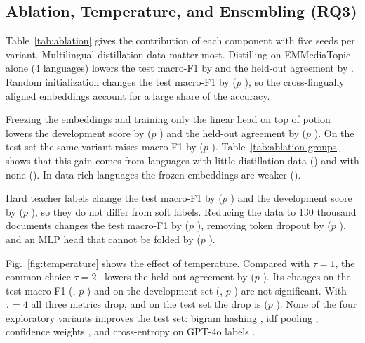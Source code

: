 \subsection{Ablation, Temperature, and Ensembling (RQ3)}
\TabAblation
\TabAblationGroups
Table~\ref{tab:ablation} gives the contribution of each component with five seeds per variant. Multilingual distillation data matter most. Distilling on EMMediaTopic alone (4 languages) lowers the test macro-F1 by  and the held-out agreement by . Random initialization changes the test macro-F1 by  ($p$ ), so the cross-lingually aligned embeddings account for a large share of the accuracy.

Freezing the embeddings and training only the linear head on top of potion lowers the development score by  ($p$ ) and the held-out agreement by  ($p$ ). On the test set the same variant raises macro-F1 by  ($p$ ). Table~\ref{tab:ablation-groups} shows that this gain comes from languages with little distillation data () and with none (). In data-rich languages the frozen embeddings are weaker ().

Hard teacher labels change the test macro-F1 by  ($p$ ) and the development score by  ($p$ ), so they do not differ from soft labels. Reducing the data to 130 thousand documents changes the test macro-F1 by  ($p$ ), removing token dropout by  ($p$ ), and an MLP head that cannot be folded by  ($p$ ).

Fig.~\ref{fig:temperature} shows the effect of temperature. Compared with $\tau=1$, the common choice $\tau=2$~\cite{hinton2015distilling} lowers the held-out agreement by  ($p$ ). Its changes on the test macro-F1 (, $p$ ) and on the development set (, $p$ ) are not significant. With $\tau=4$ all three metrics drop, and on the test set the drop is  ($p$ ). None of the four exploratory variants improves the test set: bigram hashing , idf pooling , confidence weights , and cross-entropy on GPT-4o labels .

